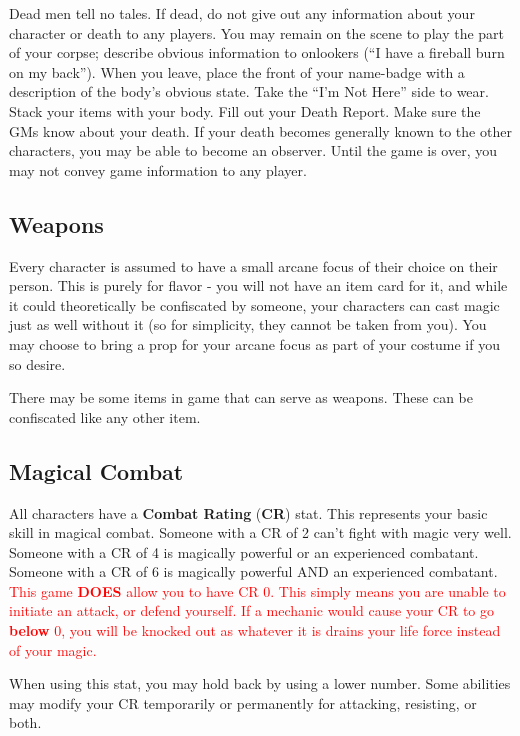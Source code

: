 \documentclass[sheet]{GL2020}
\begin{document}
Dead men tell no tales. If dead, do not give out any information about your character or death to any players. You may remain on the scene to play the part of your corpse; describe obvious information to onlookers (``I have a fireball burn on my back''). When you leave, place the front of your name-badge with a description of the body's obvious state. Take the ``I'm Not Here'' side to wear. Stack your items with your body. Fill out your Death Report. Make sure the GMs know about your death. If your death becomes generally known to the other characters, you may be able to become an observer. Until the game is over, you may not convey game information to any player.

\subsection{Weapons}
Every character is assumed to have a small arcane focus of their choice on their person. This is purely for flavor - you will not have an item card for it, and while it could theoretically be confiscated by someone, your characters can cast magic just as well without it (so for simplicity, they cannot be taken from you). You may choose to bring a prop for your arcane focus as part of your costume if you so desire.

There may be some items in game that can serve as weapons. These can be confiscated like any other item.

\subsection{Magical Combat}
All characters have a {\bf Combat Rating} ({\bf CR}) stat. This represents your basic skill in magical combat. Someone with a CR of 2 can't fight with magic very well. Someone with a CR of 4 is magically powerful or an experienced combatant. Someone with a CR of 6 is magically powerful AND an experienced combatant. \textcolor{red}{This game \textbf{DOES} allow you to have CR 0. This simply means you are unable to initiate an attack, or defend yourself. If a mechanic would cause your CR to go \textbf{below} 0, you will be knocked out as whatever it is drains your life force instead of your magic.}

When using this stat, you may hold back by using a lower number. Some abilities may modify your CR temporarily or permanently for attacking, resisting, or both.
\end{document}
